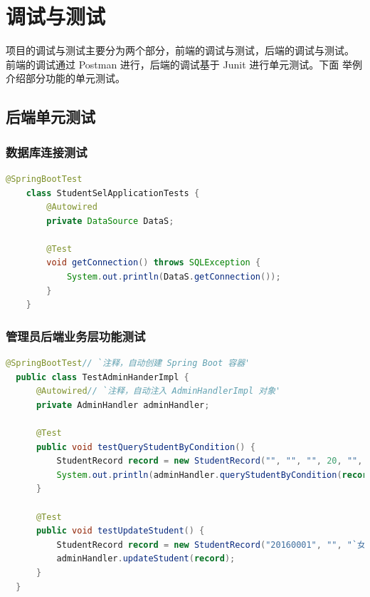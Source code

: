 \documentclass[12pt, a4paper]{article}
\begin{document}
\section{调试与测试}
项目的调试与测试主要分为两个部分，前端的调试与测试，后端的调试与测试。
前端的调试通过 Postman 进行，后端的调试基于 Junit 进行单元测试。下面
举例介绍部分功能的单元测试。
\subsection{后端单元测试}
\subsubsection{数据库连接测试}
\begin{lstlisting}[language=Java]
	@SpringBootTest
	class StudentSelApplicationTests {
		@Autowired
		private DataSource DataS;
	
		@Test
		void getConnection() throws SQLException {
			System.out.println(DataS.getConnection());
		}
	}
\end{lstlisting}

\subsubsection{管理员后端业务层功能测试}
\begin{lstlisting}[language=Java]
  @SpringBootTest// `注释，自动创建 Spring Boot 容器'
  public class TestAdminHanderImpl {
      @Autowired// `注释，自动注入 AdminHandlerImpl 对象'
      private AdminHandler adminHandler;

      @Test
      public void testQueryStudentByCondition() {
          StudentRecord record = new StudentRecord("", "", "", 20, "", "");
          System.out.println(adminHandler.queryStudentByCondition(record));
      }

      @Test
      public void testUpdateStudent() {
          StudentRecord record = new StudentRecord("20160001", "", "`女'", -1, "123", "");
          adminHandler.updateStudent(record);
      }
  }
	
\end{lstlisting}
\end{document}
